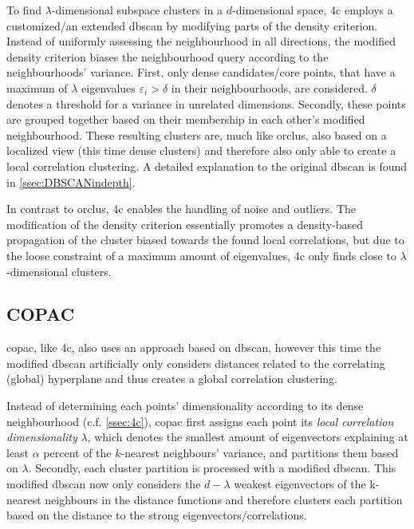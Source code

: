 To find $\lambda$-dimensional subspace clusters in a $d$-dimensional space, \gls{4c} employs a customized/an extended \acrshort{dbscan} by modifying parts of the density criterion. 
Instead of uniformly assessing the neighbourhood in all directions, the modified density criterion biases the neighbourhood query according to the neighbourhoods' variance. First, only dense candidates/core points, that have a maximum of $\lambda$ eigenvalues $\varepsilon_i > \delta$ in their neighbourhoods, are considered. $\delta$ denotes a threshold for a variance in unrelated dimensions. Secondly, these points are grouped together based on their membership in each other's modified neighbourhood. These resulting clusters are, much like \gls{orclus}, also based on a localized view (this time dense clusters) and therefore also only able to create a local correlation clustering\cite{4cbohm2004computing}. A detailed explanation to the original \acrshort{dbscan} is found in \autoref{ssec:DBSCANindepth}.

In contrast to \gls{orclus}, \gls{4c} enables the handling of noise and outliers. The modification of the density criterion essentially promotes a density-based propagation of the cluster biased towards the found local correlations, but due to the loose constraint of a maximum amount of eigenvalues, \gls{4c} only finds close to $\lambda$-dimensional clusters.

\subsection{COPAC}
\gls{copac}, like \gls{4c}, also uses an approach based on \acrshort{dbscan}, however this time the modified \acrshort{dbscan} artificially only considers distances related to the correlating (global) hyperplane and thus creates a global correlation clustering. 

Instead of determining each points' dimensionality according to its dense neighbourhood (c.f. \autoref{ssec:4c}), \gls{copac} first assigns each point its \textit{local correlation dimensionality} $\lambda$, which denotes the smallest amount of eigenvectors explaining at least $\alpha$ percent of the $k$-nearest neighbours' variance, and partitions them based on $\lambda$. Secondly, each cluster partition is processed with a modified \acrshort{dbscan}. This modified \acrshort{dbscan} now only considers the $d-\lambda$ weakest eigenvectors of the k-nearest neighbours in the distance functions and therefore clusters each partition based on the distance to the strong eigenvectors/correlations.


